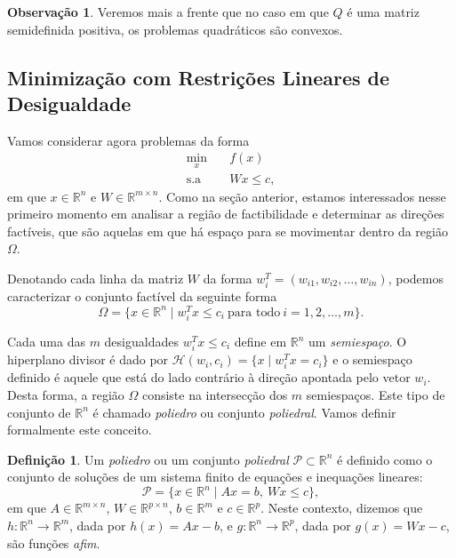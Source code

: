 \documentclass[12pt,a4paper]{scrartcl}
\def\Hset{\mathcal{H}}
\def\RR{\mathds{R}}
\theoremstyle{definition}%
\newtheorem{defi}{Definição}
\newtheorem{obs}{Observação}
\begin{document}
\begin{obs}
Veremos mais a frente que no caso em que $Q$ é uma matriz semidefinida positiva, os problemas quadráticos são convexos.
\end{obs}


\subsection{Minimização com Restrições Lineares de Desigualdade} \label{section:restricoes_desigualdade}

Vamos considerar agora problemas da forma
\[ \label{problema_geral_minimizacao_desigualdade}
\begin{aligned}
\min_{x} & \quad f(x) \\
\text{s.a} & \quad Wx \leq c,
\end{aligned}
\]
em que $x \in \RR^{n}$ e $W \in \RR^{m\times n}$. Como na seção anterior, estamos interessados nesse primeiro momento em analisar a região de factibilidade e determinar as direções factíveis, que são aquelas em que há espaço para se movimentar dentro da região $\Omega$. 

Denotando cada linha da matriz $W$ da forma $w_{i}^{T} = (w_{i1} , w_{i2} , \ldots , w_{in})$, podemos caracterizar o conjunto factível da seguinte forma
\[
\Omega = \{ x\in \RR^{n} \mid w_{i}^{T}x \leq c_{i} \ \text{para todo} \ i = 1,2, \ldots , m \} .
\]

Cada uma das $m$ desigualdades $w_{i}^{T}x \leq c_{i}$ define em $\RR^{n}$ um \emph{semiespaço}. O hiperplano divisor é dado por $\Hset (w_{i}, c_{i}) = \{ x \mid w_{i}^{T}x = c_{i} \}$ e o semiespaço definido é aquele que está do lado contrário à direção apontada pelo vetor $w_{i}$. Desta forma, a região $\Omega$ consiste na intersecção dos $m$ semiespaços. Este tipo de conjunto de $\RR^{n}$ é chamado \emph{poliedro} ou conjunto \emph{poliedral}. Vamos definir formalmente este conceito.


\begin{defi} \label{defi:conjunto_poliedral}
Um \emph{poliedro} ou um conjunto \emph{poliedral} $\mathcal{P} \subset \RR^{n}$ é definido como o conjunto de soluções de um sistema finito de equações e inequações lineares:
\[
\mathcal{P} = \{ x\in \RR^{n} \mid Ax=b, \ Wx \leq c \} ,
\] 
em que $A\in \RR^{m\times n}$, $W\in \RR^{p\times n}$, $b\in \RR^{m}$ e $c\in \RR^{p}$. Neste contexto, dizemos que $h:\RR^{n} \rightarrow \RR^{m}$, dada por $h(x) = Ax-b$, e $g:\RR^{n} \rightarrow \RR^{p}$, dada por $g(x)=Wx-c$, são funções \emph{afim}.
\end{defi}
\end{document}
